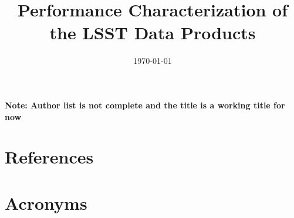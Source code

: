 \documentclass[]{spie}
\date{\today}
\title{Performance Characterization of the LSST Data Products}
\begin{document}
\maketitle

\textbf{Note: Author list is not complete and the title is a working title for now }






\appendix
%
\section{References} \label{sec:bib}



\section{Acronyms} \label{sec:acronyms}

\end{document}
